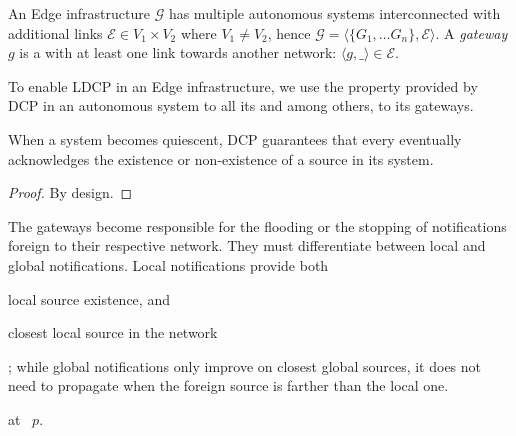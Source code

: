 
\begin{definition}
  An Edge infrastructure $\mathcal{G}$ has multiple autonomous systems
  interconnected with additional links $\mathcal{E} \in V_1 \times
  V_2$ where $V_1 \neq V_2$, hence $\mathcal{G} = \langle \{G_1,
  \ldots G_n\}, \mathcal{E} \rangle$. A \emph{gateway} $g$ is a
  \process with at least one link towards another network: $\langle g,
  \_ \rangle \in \mathcal{E}$.
\end{definition}

\begin{definition}
\end{definition}

To enable LDCP in an Edge infrastructure, we use the property provided
by DCP in an autonomous system to all its \processes and among others,
to its gateways.

\begin{lemma}
  When a system becomes quiescent, DCP guarantees that every \process
  eventually acknowledges the existence or non-existence of a source
  in its system.
\end{lemma}

\begin{proof}
  By design.
\end{proof}

The gateways become responsible for the flooding or the stopping of
notifications foreign to their respective network. They must
differentiate between local and global notifications. Local
notifications provide both \begin{inparaenum}[(i)]
\item local source existence, and
\item closest local source in the network
\end{inparaenum}; while global notifications only improve on closest global sources,
\ie it does not need to propagate when the foreign source is farther
than the local one.

\begin{definition}
\end{definition} 



\begin{algorithm}[h]
  
  \caption{\label{algo:xascast}\NAMEC at \Process~$p$. }
\end{algorithm}


